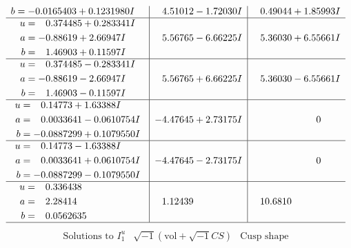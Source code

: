 \documentclass[1p]{elsarticle_modified}
\theoremstyle{definition}
\newcommand{\I}{\sqrt{-1}}
\begin{document}
$$\begin{array}{c|c|c}
\begin{aligned}
b &= -0.0165403 + 0.1231980 I\end{aligned}
 & \phantom{-}4.51012 - 1.72030 I & \phantom{-}0.49044 + 1.85993 I \\ \hline\begin{aligned}
u &= \phantom{-}0.374485 + 0.283341 I \\
a &= -0.88619 + 2.66947 I \\
b &= \phantom{-}1.46903 + 0.11597 I\end{aligned}
 & \phantom{-}5.56765 - 6.66225 I & \phantom{-}5.36030 + 6.55661 I \\ \hline\begin{aligned}
u &= \phantom{-}0.374485 - 0.283341 I \\
a &= -0.88619 - 2.66947 I \\
b &= \phantom{-}1.46903 - 0.11597 I\end{aligned}
 & \phantom{-}5.56765 + 6.66225 I & \phantom{-}5.36030 - 6.55661 I \\ \hline\begin{aligned}
u &= \phantom{-}0.14773 + 1.63388 I \\
a &= \phantom{-}0.0033641 - 0.0610754 I \\
b &= -0.0887299 + 0.1079550 I\end{aligned}
 & -4.47645 + 2.73175 I & \phantom{-0.000000 } 0 \\ \hline\begin{aligned}
u &= \phantom{-}0.14773 - 1.63388 I \\
a &= \phantom{-}0.0033641 + 0.0610754 I \\
b &= -0.0887299 - 0.1079550 I\end{aligned}
 & -4.47645 - 2.73175 I & \phantom{-0.000000 } 0 \\ \hline\begin{aligned}
u &= \phantom{-}0.336438\phantom{ +0.000000I} \\
a &= \phantom{-}2.28414\phantom{ +0.000000I} \\
b &= \phantom{-}0.0562635\phantom{ +0.000000I}\end{aligned}
 & \phantom{-}1.12439\phantom{ +0.000000I} & \phantom{-}10.6810\phantom{ +0.000000I}\\
 \hline 
 \end{array}$$\newpage$$\begin{array}{c|c|c}  
\text{Solutions to }I^u_{1}& \I (\text{vol} + \sqrt{-1}CS) & \text{Cusp shape}\\
 \hline 
\begin{aligned}

\end{aligned}
\end{array}$$
\end{document}
